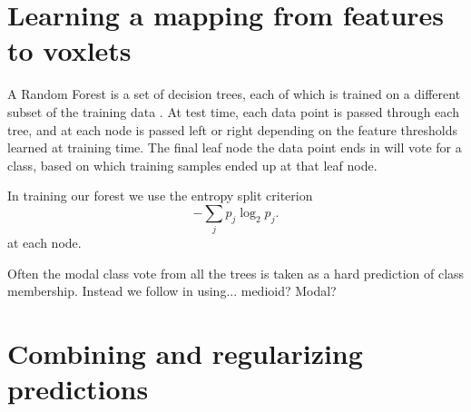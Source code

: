 \documentclass[10pt,twocolumn,letterpaper]{article}
\makeatletter
\renewcommand*{\eg}{e.g.\@\xspace}
\makeatother
\begin{document}
\section{Learning a mapping from features to voxlets}


A Random Forest is a set of decision trees, each of which is trained on a different subset of the training data \cite{breiman-ml-2001}.
At test time, each data point is passed through each tree, and at each node is passed left or right depending on the feature thresholds learned at training time. The final leaf node the data point ends in will vote for a class, based on which training samples ended up at that leaf node.


In training our forest we use the entropy split criterion
\begin{equation}
- \sum_j p_j \log_2 p_j.
\end{equation}
at each node.

Often the modal class vote from all the trees is taken as a hard prediction of class membership. Instead we follow \cite{} in using... medioid? Modal?





\section{Combining and regularizing predictions}
\end{document}
